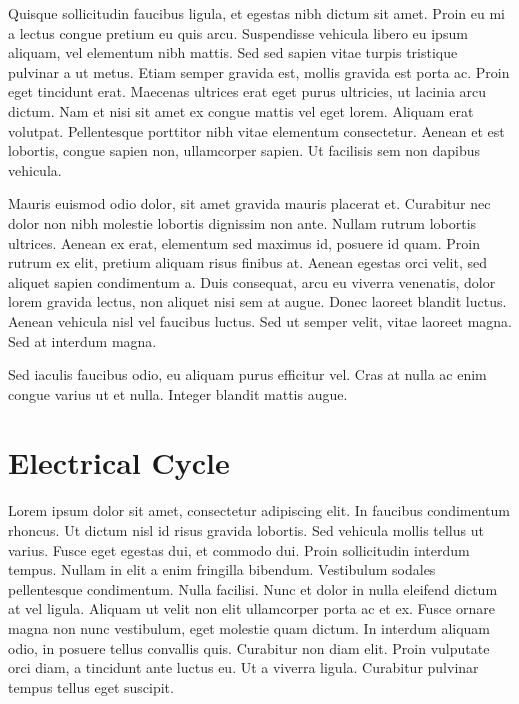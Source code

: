 Quisque sollicitudin faucibus ligula, et egestas nibh dictum sit amet. Proin eu mi a lectus congue pretium eu quis arcu. Suspendisse vehicula libero eu ipsum aliquam, vel elementum nibh mattis. Sed sed sapien vitae turpis tristique pulvinar a ut metus. Etiam semper gravida est, mollis gravida est porta ac. Proin eget tincidunt erat. Maecenas ultrices erat eget purus ultricies, ut lacinia arcu dictum. Nam et nisi sit amet ex congue mattis vel eget lorem. Aliquam erat volutpat. Pellentesque porttitor nibh vitae elementum consectetur. Aenean et est lobortis, congue sapien non, ullamcorper sapien. Ut facilisis sem non dapibus vehicula.

Mauris euismod odio dolor, sit amet gravida mauris placerat et. Curabitur nec dolor non nibh molestie lobortis dignissim non ante. Nullam rutrum lobortis ultrices. Aenean ex erat, elementum sed maximus id, posuere id quam. Proin rutrum ex elit, pretium aliquam risus finibus at. Aenean egestas orci velit, sed aliquet sapien condimentum a. Duis consequat, arcu eu viverra venenatis, dolor lorem gravida lectus, non aliquet nisi sem at augue. Donec laoreet blandit luctus. Aenean vehicula nisl vel faucibus luctus. Sed ut semper velit, vitae laoreet magna. Sed at interdum magna.

Sed iaculis faucibus odio, eu aliquam purus efficitur vel. Cras at nulla ac enim congue varius ut et nulla. Integer blandit mattis augue.

\section{Electrical Cycle}
\label{sec:electcycle}

Lorem ipsum dolor sit amet, consectetur adipiscing elit. In faucibus condimentum rhoncus. Ut dictum nisl id risus gravida lobortis. Sed vehicula mollis tellus ut varius. Fusce eget egestas dui, et commodo dui. Proin sollicitudin interdum tempus. Nullam in elit a enim fringilla bibendum. Vestibulum sodales pellentesque condimentum. Nulla facilisi. Nunc et dolor in nulla eleifend dictum at vel ligula. Aliquam ut velit non elit ullamcorper porta ac et ex. Fusce ornare magna non nunc vestibulum, eget molestie quam dictum. In interdum aliquam odio, in posuere tellus convallis quis. Curabitur non diam elit. Proin vulputate orci diam, a tincidunt ante luctus eu. Ut a viverra ligula. Curabitur pulvinar tempus tellus eget suscipit.

